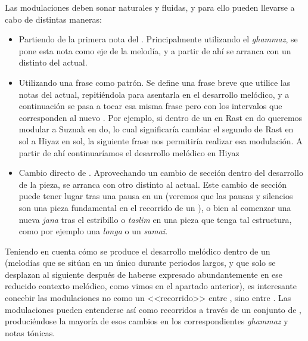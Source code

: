 Las modulaciones deben sonar naturales y fluidas, y para ello pueden llevarse a cabo de distintas maneras:

\begin{itemize}

\item Partiendo de la primera nota del \yinsb. Principalmente utilizando el \emph{ghammaz}, se pone esta nota como eje de la melodía, y a partir de ahí se arranca con un \yins distinto del actual.

\item Utilizando una frase como patrón. Se define una frase breve que utilice las notas del \yins actual, repitiéndola para asentarla en el desarrollo melódico, y a continuación se pasa a tocar esa misma frase pero con los intervalos que corresponden al nuevo \yinsb. Por ejemplo, si dentro de un \taqsim en Rast en do queremos modular a \maqam Suznak en do, lo cual significaría cambiar el segundo \yins de Rast en sol a Hiyaz en sol, la siguiente frase nos permitiría realizar esa modulación. A partir de ahí continuaríamos el desarrollo melódico en \yins Hiyaz

\end{itemize}


\begin{center}
\end{center}


\begin{itemize}

\item Cambio directo de \yins. Aprovechando un cambio de sección dentro del desarrollo de la pieza, se arranca con otro \yins distinto al actual. Este cambio de sección puede tener lugar tras una pausa en un \taqsim (veremos que las pausas y silencios son una pieza fundamental en el recorrido de un \taqsimb), o bien al comenzar una nueva \emph{jana} tras el estribillo o \emph{taslim} en una pieza que tenga tal estructura, como por ejemplo una \emph{longa} o un \emph{samai}.

\end{itemize}

Teniendo en cuenta cómo se produce el desarrollo melódico dentro de un \maqam (melodías que se sitúan en un único \yins durante periodos largos, y que solo se desplazan al siguiente después de haberse expresado abundantemente en ese reducido contexto melódico, como vimos en el apartado anterior), es interesante concebir las modulaciones no como un <<recorrido>> entre \maqamaatb, sino entre \ashnasb. Las modulaciones pueden entenderse así como recorridos a través de un conjunto de \ashnasb, produciéndose la mayoría de esos cambios en los correspondientes \emph{ghammaz} y notas tónicas.

